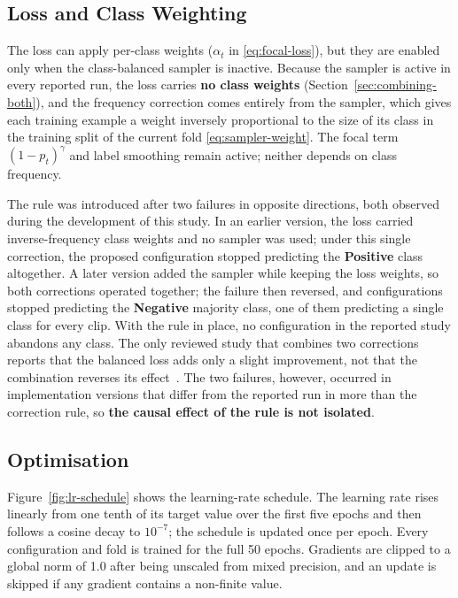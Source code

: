 \subsection{Loss and Class Weighting}
\label{sec:loss-config}
\label{sec:class-weighting-rule}
\label{sec:sampler-config}

The loss can apply per-class weights ($\alpha_t$ in \eqref{eq:focal-loss}), but they are enabled only when the class-balanced sampler is inactive. Because the sampler is active in every reported run, the loss carries \textbf{no class weights} (Section~\ref{sec:combining-both}), and the frequency correction comes entirely from the sampler, which gives each training example a weight inversely proportional to the size of its class in the training split of the current fold \eqref{eq:sampler-weight}. The focal term $(1-p_t)^\gamma$ and label smoothing remain active; neither depends on class frequency.

The rule was introduced after two failures in opposite directions, both observed during the development of this study. In an earlier version, the loss carried inverse-frequency class weights and no sampler was used; under this single correction, the proposed configuration stopped predicting the \textbf{Positive} class altogether. A later version added the sampler while keeping the loss weights, so both corrections operated together; the failure then reversed, and configurations stopped predicting the \textbf{Negative} majority class, one of them predicting a single class for every clip. With the rule in place, no configuration in the reported study abandons any class. The only reviewed study that combines two corrections reports that the balanced loss adds only a slight improvement, not that the combination reverses its effect~\cite{xia2020a}. The two failures, however, occurred in implementation versions that differ from the reported run in more than the correction rule, so \textbf{the causal effect of the rule is not isolated}.

\subsection{Optimisation}
\label{sec:optimiser-config}
\label{sec:batch-size}
\label{sec:numerical-safeguards}

Figure~\ref{fig:lr-schedule} shows the learning-rate schedule. The learning rate rises linearly from one tenth of its target value over the first five epochs and then follows a cosine decay to $10^{-7}$; the schedule is updated once per epoch. Every configuration and fold is trained for the full 50 epochs. Gradients are clipped to a global norm of 1.0 after being unscaled from mixed precision, and an update is skipped if any gradient contains a non-finite value.

